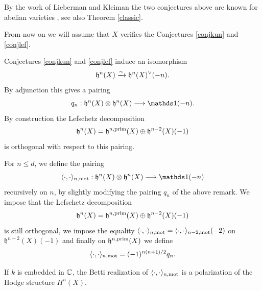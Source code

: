 \begin{remark}
\notready
By the work of Lieberman and Kleiman the two conjectures above are known for abelian varieties \cite{GKL,Lieb}, see also Theorem \ref{classic}.
\end{remark}
\begin{assumption}
\notready\label{kun+lef}
From now on we will assume that $X$ verifies the   Conjectures \ref{conjkun} and \ref{conjlef}.
\end{assumption}
\begin{remark}
\notready
Conjectures \ref{conjkun} and \ref{conjlef} induce an isomorphism
\[\mathfrak{h}^n(X) \xrightarrow{\sim } \mathfrak{h}^{n}(X)^{\vee}(-n).\]
By adjunction this gives a pairing
\[q_n : \mathfrak{h}^n(X) \otimes \mathfrak{h}^{n}(X)  \longrightarrow \one(-n).\]
By construction  the Lefschetz decomposition
\[\mathfrak{h}^{n }(X)=\mathfrak{h}^{n,\mathrm{prim}}(X) \oplus \mathfrak{h}^{n-2}(X)(-1)\]
is orthogonal with respect to this pairing.
\end{remark}
\begin{definition}
\notready\label{defpairingmot} For $n\leq d$, we define the pairing
\[\langle \cdot, \cdot \rangle_{n,\mot} : \mathfrak{h}^n(X) \otimes \mathfrak{h}^{n}(X)  \longrightarrow \one(-n)\]
recursively on $n$, by slightly modifying the pairing $q_n$ of the above remark. We impose that  the Lefschetz decomposition
\[\mathfrak{h}^{n }(X)=\mathfrak{h}^{n,\mathrm{prim}}(X) \oplus \mathfrak{h}^{n-2}(X)(-1)\]
is still orthogonal, we impose the equality $\langle \cdot, \cdot \rangle_{n,\mathrm{mot}} =\langle \cdot, \cdot \rangle_{n-2,\mathrm{mot}}(-2) $ on $\mathfrak{h}^{n-2}(X)(-1)$  and finally on $\mathfrak{h}^{n,\mathrm{prim}}(X)$ we define \[\langle \cdot, \cdot \rangle_{n,\mathrm{mot}}  = (-1)^{n(n+1)/2}q_n. \]

 \end{definition}
 \begin{remark}
\notready\label{rempola}
If $k$ is embedded in $\mathbb{C}$, the Betti realization of $\langle \cdot, \cdot \rangle_{n,\mathrm{mot}}$ is a polarization of the Hodge structure $H^n(X)$.
\end{remark}
